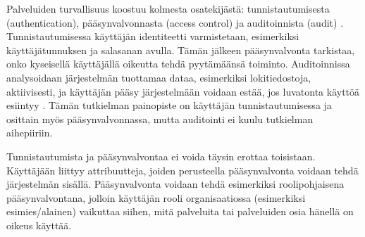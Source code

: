 Palveluiden turvallisuus koostuu kolmesta osatekijästä: tunnistautumisesta (authentication), pääsynvalvonnasta (access control) ja auditoinnista (audit) \cite{sandhu}. Tunnistautumisessa käyttäjän identiteetti varmistetaan, esimerkiksi käyttäjätunnuksen ja salasanan avulla. Tämän jälkeen pääsynvalvonta tarkistaa, onko kyseisellä käyttäjällä oikeutta tehdä pyytämäänsä toiminto. Auditoinnissa analysoidaan järjestelmän tuottamaa dataa, esimerkiksi lokitiedostoja, aktiivisesti, ja käyttäjän pääsy järjestelmään voidaan estää, jos luvatonta käyttöä esiintyy \cite{sandhu}. Tämän tutkielman painopiste on käyttäjän tunnistautumisessa ja osittain myös pääsynvalvonnassa, mutta auditointi ei kuulu tutkielman aihepiiriin.

Tunnistautumista ja pääsynvalvontaa ei voida täysin erottaa toisistaan. Käyttäjään liittyy attribuutteja, joiden perusteella pääsynvalvonta voidaan tehdä järjestelmän sisällä. Pääsynvalvonta voidaan tehdä esimerkiksi roolipohjaisena pääsynvalvontana, jolloin käyttäjän rooli organisaatiossa (esimerkiksi esimies/alainen) vaikuttaa siihen, mitä palveluita tai palveluiden osia hänellä on oikeus käyttää.
